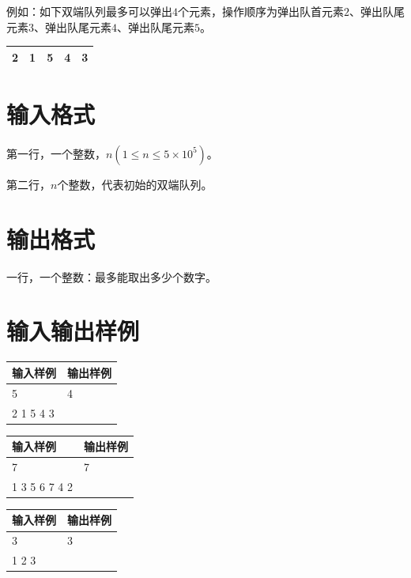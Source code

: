 \documentclass[
	lang=cn,
	color=green
]{elegantbook}
\begin{document}
例如：如下双端队列最多可以弹出$4$个元素，操作顺序为弹出队首元素$2$、弹出队尾元素$3$、弹出队尾元素$4$、弹出队尾元素$5$。

\begin{center}
    \begin{tabularx}{200pt}{M|M|M|M|M}
         & 1 & 5 & 4 & 3 \\
        \bottomrule
    \end{tabularx}
\end{center}

\section*{输入格式}
第一行，一个整数，$n(1 \leq n \leq 5 \times 10^5)$。

第二行，$n$个整数，代表初始的双端队列。

\section*{输出格式}
一行，一个整数：最多能取出多少个数字。

\section*{输入输出样例}
\begin{tabularx}{450pt}{X|X}
    \toprule
    输入样例  & 输出样例 \\
    \midrule
    5         & 4        \\
    2 1 5 4 3 &          \\
    \bottomrule
\end{tabularx}
\vspace{0.5cm}

\begin{tabularx}{450pt}{X|X}
    \toprule
    输入样例      & 输出样例 \\
    \midrule
    7             & 7        \\
    1 3 5 6 7 4 2 &          \\
    \bottomrule
\end{tabularx}
\vspace{0.5cm}

\begin{tabularx}{450pt}{X|X}
    \toprule
    输入样例 & 输出样例 \\
    \midrule
    3        & 3        \\
    1 2 3    &          \\
    \bottomrule
\end{tabularx}
\vspace{0.5cm}
\end{document}
